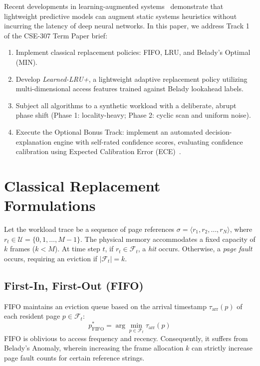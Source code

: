 \documentclass[10pt,twocolumn,a4paper]{article}
\begin{document}
Recent developments in learning-augmented systems~\cite{kraska2018case, vietri2018driving} demonstrate that lightweight predictive models can augment static systems heuristics without incurring the latency of deep neural networks. In this paper, we address Track 1 of the CSE-307 Term Paper brief:
\begin{enumerate}
    \item Implement classical replacement policies: FIFO, LRU, and Belady's Optimal (MIN).
    \item Develop \textit{Learned-LRU+}, a lightweight adaptive replacement policy utilizing multi-dimensional access features trained against Belady lookahead labels.
    \item Subject all algorithms to a synthetic workload with a deliberate, abrupt phase shift (Phase 1: locality-heavy; Phase 2: cyclic scan and uniform noise).
    \item Execute the Optional Bonus Track: implement an automated decision-explanation engine with self-rated confidence scores, evaluating confidence calibration using Expected Calibration Error (ECE)~\cite{guo2017calibration}.
\end{enumerate}

\section{Classical Replacement Formulations}

Let the workload trace be a sequence of page references $\sigma = \langle r_1, r_2, \dots, r_N \rangle$, where $r_t \in \mathcal{U} = \{0, 1, \dots, M-1\}$. The physical memory accommodates a fixed capacity of $k$ frames ($k < M$). At time step $t$, if $r_t \in \mathcal{F}_t$, a \textit{hit} occurs. Otherwise, a \textit{page fault} occurs, requiring an eviction if $|\mathcal{F}_t| = k$.

\subsection{First-In, First-Out (FIFO)}
FIFO maintains an eviction queue based on the arrival timestamp $\tau_{\text{arr}}(p)$ of each resident page $p \in \mathcal{F}_t$:
\begin{equation}
p^*_{\text{FIFO}} = \arg\min_{p \in \mathcal{F}_t} \tau_{\text{arr}}(p)
\end{equation}
FIFO is oblivious to access frequency and recency. Consequently, it suffers from Belady's Anomaly, wherein increasing the frame allocation $k$ can strictly increase page fault counts for certain reference strings.
\end{document}
